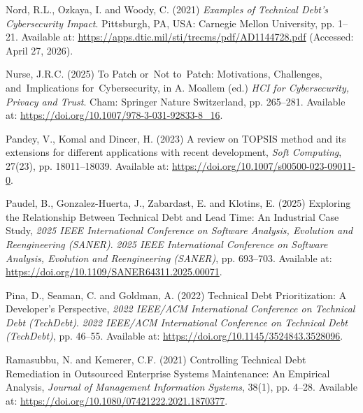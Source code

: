 \documentclass[
  12pt,
  letterpaper,
  12pt,
  oneside,
  english,
  onehalfspacing,
  headsepline]{MastersDoctoralThesis}
\newlength{\cslhangindent}
\newenvironment{CSLReferences}[2] %
 {\begin{list}{}{%
  \setlength{\itemindent}{0pt}
  \setlength{\leftmargin}{0pt}
  \setlength{\parsep}{0pt}
  \ifodd #1
   \setlength{\leftmargin}{\cslhangindent}
   \setlength{\itemindent}{-1\cslhangindent}
  \fi
  \setlength{\itemsep}{#2\baselineskip}}}
 {\end{list}}
\begin{document}
\begin{CSLReferences}{0}{1}
Nord, R.L., Ozkaya, I. and Woody, C. (2021) \emph{Examples of {Technical
Debt}'s {Cybersecurity Impact}}. Pittsburgh, PA, USA: Carnegie Mellon
University, pp. 1--21. Available at:
\url{https://apps.dtic.mil/sti/trecms/pdf/AD1144728.pdf} (Accessed:
April 27, 2026).

Nurse, J.R.C. (2025) \textquotesingle To {Patch} or~{Not} to~{Patch}:
{Motivations}, {Challenges}, and~{Implications}
for~{Cybersecurity}\textquotesingle, in A. Moallem (ed.) \emph{{HCI} for
{Cybersecurity}, {Privacy} and {Trust}}. Cham: Springer Nature
Switzerland, pp. 265--281. Available at:
\url{https://doi.org/10.1007/978-3-031-92833-8_16}.

Pandey, V., Komal and Dincer, H. (2023) \textquotesingle A review on
{TOPSIS} method and its extensions for different applications with
recent development\textquotesingle, \emph{Soft Computing}, 27(23), pp.
18011--18039. Available at:
\url{https://doi.org/10.1007/s00500-023-09011-0}.

Paudel, B., Gonzalez-Huerta, J., Zabardast, E. and Klotins, E. (2025)
\textquotesingle Exploring the {Relationship Between Technical Debt} and
{Lead Time}: {An Industrial Case Study}\textquotesingle, \emph{2025
{IEEE International Conference} on {Software Analysis}, {Evolution} and
{Reengineering} ({SANER})}. \emph{2025 {IEEE International Conference}
on {Software Analysis}, {Evolution} and {Reengineering} ({SANER})}, pp.
693--703. Available at:
\url{https://doi.org/10.1109/SANER64311.2025.00071}.

Pina, D., Seaman, C. and Goldman, A. (2022) \textquotesingle Technical
{Debt Prioritization}: {A Developer}'s {Perspective}\textquotesingle,
\emph{2022 {IEEE}/{ACM International Conference} on {Technical Debt}
({TechDebt})}. \emph{2022 {IEEE}/{ACM International Conference} on
{Technical Debt} ({TechDebt})}, pp. 46--55. Available at:
\url{https://doi.org/10.1145/3524843.3528096}.

Ramasubbu, N. and Kemerer, C.F. (2021) \textquotesingle Controlling
{Technical Debt Remediation} in {Outsourced Enterprise Systems
Maintenance}: {An Empirical Analysis}\textquotesingle, \emph{Journal of
Management Information Systems}, 38(1), pp. 4--28. Available at:
\url{https://doi.org/10.1080/07421222.2021.1870377}.


\end{CSLReferences}
\end{document}
